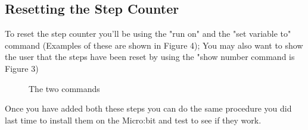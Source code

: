 \documentclass{article}
\begin{document}
\subsection{Resetting the Step Counter}
To reset the step counter you'll be using the "run on" and the "set variable to" command (Examples of these are shown in Figure 4); You may also want to show the user that the steps have been reset by using the "show number command is Figure 3)
\begin{figure}[!hp]
  \centering
  \hfill
  \caption{The two commands}
\end{figure}


Once you have added both these steps you can do the same procedure you did last time to install them on the Micro:bit and test to see if they work.
\end{document}
